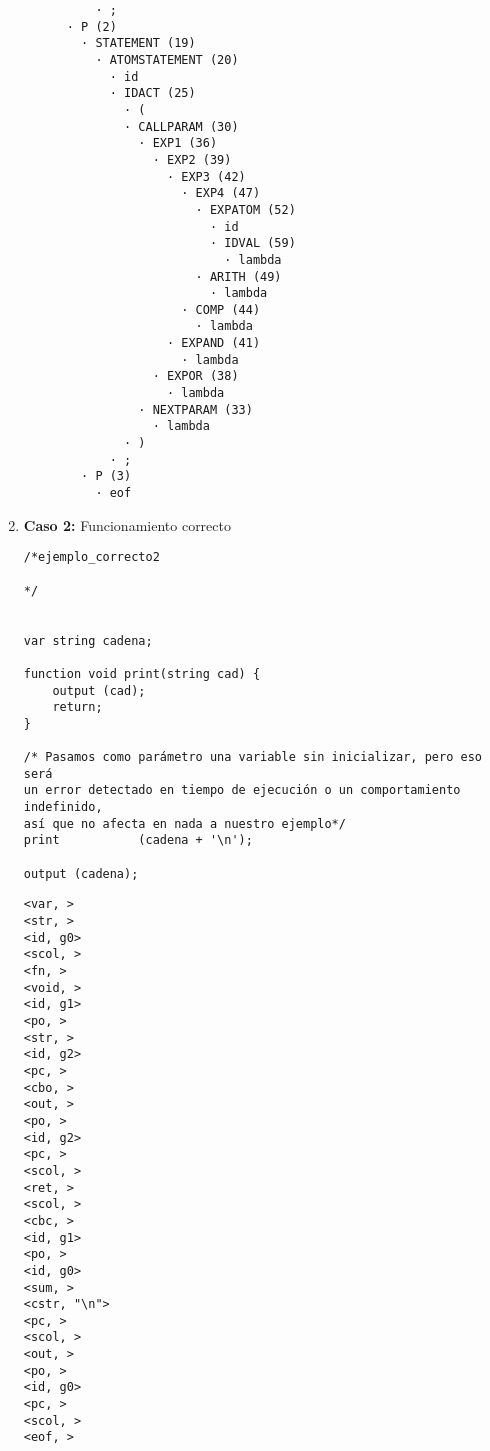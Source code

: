 \begin{enumerate}
\begin{tcolorbox}[title={Árbol sintáctico}, colback=white, breakable]
\begin{lstlisting}
          · ;
      · P (2)
        · STATEMENT (19)
          · ATOMSTATEMENT (20)
            · id
            · IDACT (25)
              · (
              · CALLPARAM (30)
                · EXP1 (36)
                  · EXP2 (39)
                    · EXP3 (42)
                      · EXP4 (47)
                        · EXPATOM (52)
                          · id
                          · IDVAL (59)
                            · lambda
                        · ARITH (49)
                          · lambda
                      · COMP (44)
                        · lambda
                    · EXPAND (41)
                      · lambda
                  · EXPOR (38)
                    · lambda
                · NEXTPARAM (33)
                  · lambda
              · )
            · ;
        · P (3)
          · eof
        \end{lstlisting}
    \end{tcolorbox}




    \item \textbf{Caso 2:} Funcionamiento correcto
    \begin{tcolorbox}[title={Código fuente}, colback=white]
        \begin{lstlisting}
/*ejemplo_correcto2

*/


var string cadena;

function void print(string cad) {
	output (cad);
	return;
}

/* Pasamos como parámetro una variable sin inicializar, pero eso será
un error detectado en tiempo de ejecución o un comportamiento indefinido,
así que no afecta en nada a nuestro ejemplo*/
print			(cadena + '\n');

output (cadena);
        \end{lstlisting}
    \end{tcolorbox}

    \begin{tcolorbox}[title={Volcado del fichero de tokens}, colback=white]
        \begin{lstlisting}
<var, >
<str, >
<id, g0>
<scol, >
<fn, >
<void, >
<id, g1>
<po, >
<str, >
<id, g2>
<pc, >
<cbo, >
<out, >
<po, >
<id, g2>
<pc, >
<scol, >
<ret, >
<scol, >
<cbc, >
<id, g1>
<po, >
<id, g0>
<sum, >
<cstr, "\n">
<pc, >
<scol, >
<out, >
<po, >
<id, g0>
<pc, >
<scol, >
<eof, >
        \end{lstlisting}
    \end{tcolorbox}


\end{enumerate}
